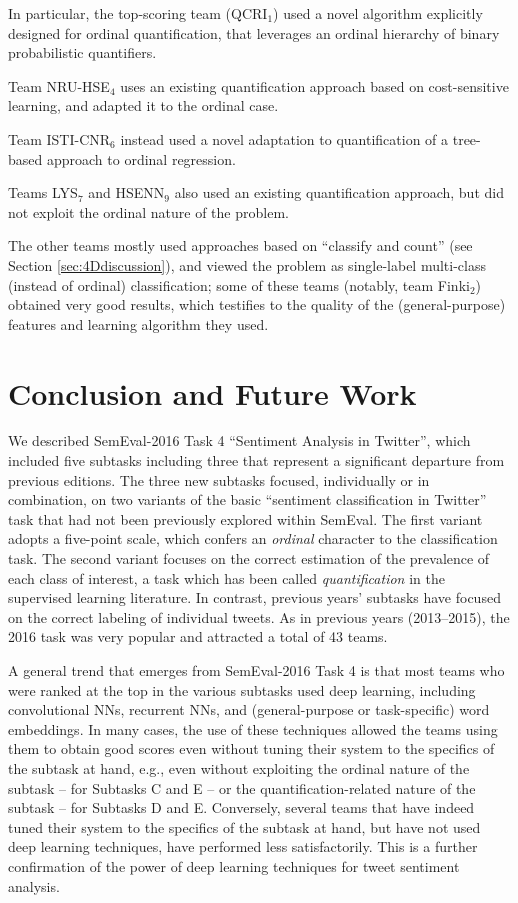 \documentclass[11pt,letterpaper]{article}
\begin{document}
In particular, the top-scoring
team (QCRI$_{1}$) used a novel algorithm explicitly designed for
ordinal quantification, that leverages an ordinal hierarchy of binary
probabilistic quantifiers. 

Team NRU-HSE$_{4}$ uses an existing
quantification approach based on cost-sensitive learning, and adapted
it to the ordinal case. 

Team ISTI-CNR$_{6}$ instead used a novel
adaptation to quantification of a tree-based approach to ordinal
regression.

Teams LYS$_{7}$ and HSENN$_{9}$ also used an existing quantification
approach, but did not exploit the ordinal nature of the problem. 

The other teams mostly used approaches based on ``classify and count'' (see
Section \ref{sec:4Ddiscussion}), and viewed the problem as single-label
multi-class (instead of ordinal) classification; some of these teams
(notably, team Finki$_{2}$) obtained very good results, which testifies
to the quality of the (general-purpose) features and learning
algorithm they used.


\section{Conclusion and Future Work}
\label{sec:conclusion}

\noindent We described SemEval-2016 Task 4 ``Sentiment Analysis
in Twitter'', which included five subtasks including three that represent a
significant departure from previous editions. The three new subtasks
focused, individually or in combination, on two variants of the basic
``sentiment classification in Twitter'' task that had not been
previously explored within SemEval.  The first variant adopts a
five-point scale, which confers an \textit{ordinal} character to the
classification task.  The second variant focuses on the correct
estimation of the prevalence of each class of interest, a task which
has been called \textit{quantification} in the supervised learning
literature. In contrast, previous years' subtasks have focused on the
correct labeling of individual tweets.  As in previous years (2013--2015), the
2016 task was very popular and attracted a total of 43 teams.

A general trend that emerges from SemEval-2016 Task 4 is
that most teams who were ranked at the top in the various subtasks used
deep learning, including convolutional NNs, recurrent NNs, and 
(general-purpose or task-specific) word embeddings. In many cases, the
use of these techniques allowed the teams using them to obtain good
scores even without tuning their system to the specifics of the
subtask at hand, e.g., even without exploiting the ordinal nature of
the subtask -- for Subtasks C and E -- or the quantification-related
nature of the subtask -- for Subtasks D and E. Conversely, several
teams that have indeed tuned their system to the specifics of the
subtask at hand, but have not used deep learning techniques, have
performed less satisfactorily. This is a further confirmation of the
power of deep learning techniques for tweet sentiment analysis.
\end{document}
